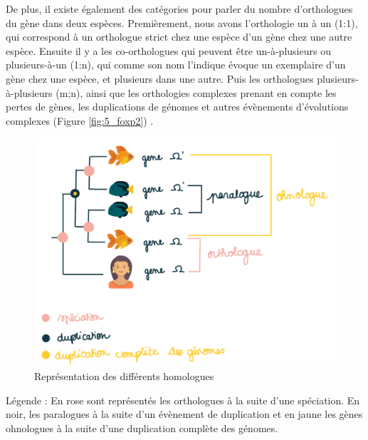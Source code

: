 \par De plus, il existe également des catégories pour parler du nombre d’orthologues du gène dans deux espèces. Premièrement, nous avons l’orthologie un à un (1:1), qui correspond à un orthologue strict chez une espèce d’un gène chez une autre espèce. Ensuite il y a les co-orthologues qui peuvent être un-à-plusieurs ou plusieurs-à-un (1:n), qui comme son nom l’indique évoque un exemplaire d’un gène chez une espèce, et plusieurs dans une autre. Puis les orthologues plusieurs-à-plusieurs (m;n), ainsi que les orthologies complexes prenant en compte les pertes de gènes, les duplications de génomes et autres évènements d’évolutions complexes (Figure \ref{fig:5_foxp2}) \parencite{koonin_orthologs_2005}.

\begin{figure}[H]
    \centering
    \includegraphics[width=1\textwidth]{figures/corps/figure6.png}
    \caption{Représentation des différents homologues}
    \label{fig:6_ortho}
\end{figure}
Légende : En rose sont représentés les orthologues à la suite d’une spéciation. En noir, les paralogues à la suite d’un évènement de duplication et en jaune les gènes ohnologues à la suite d’une duplication complète des génomes. 

